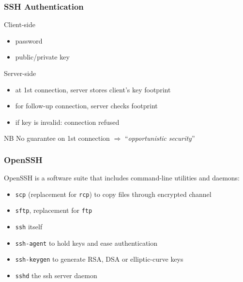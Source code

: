 \documentclass[
hyperref={pdfpagelabels=false}
,xcolor=table
]
{beamer}
\begin{document}
\begin{frame}
  \frametitle{SSH Authentication}
  \begin{block}{Client-side}
  \begin{itemize}
  \item password
  \item public/private key
  \end{itemize}
\end{block}

\begin{block}{Server-side}
  \begin{itemize}
  \item at 1st connection, server stores client's key footprint
  \item for follow-up connection, server checks footprint
  \item if key is invalid: connection refused
  \end{itemize}
\end{block}

\begin{block}{NB}
  No guarantee on 1st connection $\Longrightarrow$ ``\textit{opportunistic security}''
\end{block}
\end{frame}


\begin{frame}
  \frametitle{OpenSSH}
  OpenSSH is a software suite that includes command-line utilities and daemons:
  \begin{itemize}
  \item \texttt{scp} (replacement for \texttt{rcp}) to copy files through encrypted channel
  \item \texttt{sftp}, replacement for \texttt{ftp}
  \item \texttt{ssh} itself
  \item \texttt{ssh-agent} to hold keys and ease authentication
  \item \texttt{ssh-keygen} to generate RSA, DSA or elliptic-curve keys
  \item \texttt{sshd} the ssh server daemon
  \end{itemize}
\end{frame}
\end{document}
